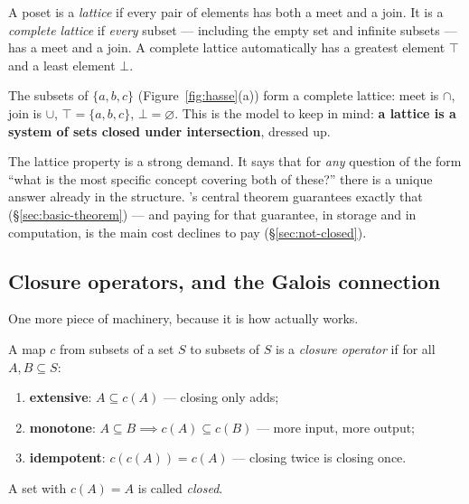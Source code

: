 \begin{definition}
A poset is a \emph{lattice} if every pair of elements has both a meet and a
join. It is a \emph{complete lattice} if \emph{every} subset --- including the
empty set and infinite subsets --- has a meet and a join. A complete lattice
automatically has a greatest element $\top$ and a least element $\bot$.
\end{definition}

\begin{example}
The subsets of $\{a,b,c\}$ (Figure~\ref{fig:hasse}(a)) form a complete
lattice: meet is $\cap$, join is $\cup$, $\top = \{a,b,c\}$,
$\bot = \varnothing$. This is the model to keep in mind: \textbf{a lattice is
a system of sets closed under intersection}, dressed up.
\end{example}

The lattice property is a strong demand. It says that for \emph{any} question
of the form ``what is the most specific concept covering both of these?''
there is a unique answer already in the structure. \fca{}'s central theorem
guarantees exactly that (\S\ref{sec:basic-theorem}) --- and paying for that
guarantee, in storage and in computation, is the main cost \odag{} declines
to pay (\S\ref{sec:not-closed}).

\subsection{Closure operators, and the Galois connection}
\label{sec:closure}

One more piece of machinery, because it is how \fca{} actually works.

\begin{definition}
A map $c$ from subsets of a set $S$ to subsets of $S$ is a \emph{closure
operator} if for all $A, B \subseteq S$:
\begin{enumerate}[label=(\roman*),leftmargin=2.2em]
\item \textbf{extensive}: $A \subseteq c(A)$ --- closing only adds;
\item \textbf{monotone}: $A \subseteq B \implies c(A) \subseteq c(B)$ ---
  more input, more output;
\item \textbf{idempotent}: $c(c(A)) = c(A)$ --- closing twice is closing once.
\end{enumerate}
A set with $c(A) = A$ is called \emph{closed}.
\end{definition}

